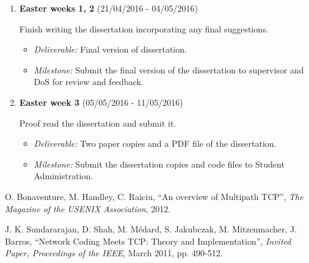 \documentclass[12pt,a4paper,twoside]{article}
\begin{document}
\begin{enumerate}
\item {\bf Easter weeks 1, 2} (21/04/2016 - 04/05/2016)

Finish writing the dissertation incorporating any final suggestions. 
\begin{itemize}
  \item {\em Deliverable:} Final version of dissertation. 
  \item {\em Milestone:} Submit the final version of the dissertation to supervisor and DoS for review and feedback. 
\end{itemize}

\item {\bf Easter week 3} (05/05/2016 - 11/05/2016)

Proof read the dissertation and submit it. 
\begin{itemize}
  \item {\em Deliverable:} Two paper copies and a PDF file of the dissertation.
  \item {\em Milestone:} Submit the dissertation copies and code files to Student Administration.
\end{itemize}

\end{enumerate}


\begin{thebibliography}{9}

  O. Bonaventure, M. Handley, C. Raiciu,
  ``An overview of Multipath TCP'',
  \emph{The Magazine of the USENIX Association},
  2012.

  J. K. Sundararajan, D. Shah, M. Médard, S. Jakubczak, M. Mitzenmacher, J. Barros,
  ``Network Coding Meets TCP: Theory and Implementation'',
  \emph{Invited Paper, Proceedings of the IEEE},
  March 2011,
  pp. 490-512.

\end{thebibliography}
\end{document}
